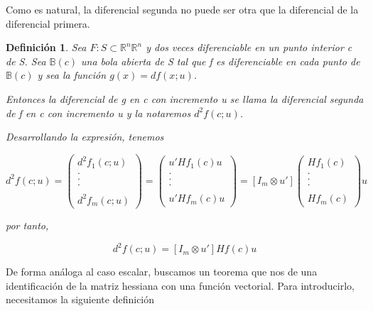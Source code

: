 \documentclass{article}
\theoremstyle{theorem-style}  %
\theoremstyle{definition-style}
\newtheorem{definition}{Definición}[section]
\theoremstyle{example-style}
\theoremstyle{exercise-style}
\begin{document}
	Como es natural, la diferencial segunda no puede ser otra que la diferencial de la diferencial primera. 
	
	\begin{definition}
		Sea $F: S \subset \mathbb{R}^n \mathbb{R}^n$ y dos veces diferenciable en un punto interior c de S. Sea $\mathbb{B}(c)$ una bola abierta de S tal que f es diferenciable en cada punto de  $\mathbb{B}(c)$  y sea la función $g(x) = df(x;u)$. 
		
		Entonces la diferencial de g en c con incremento u se llama la diferencial segunda de f en c con incremento u y la notaremos $d^2 f(c;u)$.
		
		Desarrollando la expresión, tenemos
		
		$$d^2 f(c;u)= \left({\begin{array}{c}
			d^2 f_1(c;u)\\
			.\\
			.\\
			.\\
			\\
			d^2 f_m(c;u)
			\end{array} } \right) = \left({\begin{array}{c}
			u' H f_1(c) u\\
			.\\
			.\\
			.\\
			\\
			u' H f_m(c)u
			\end{array} } \right) = [I_m \otimes u'] \left({\begin{array}{c}
			H f_1(c)\\
			.\\
			.\\
			.\\
			\\
			H f_m(c)
			\end{array} } \right)u$$
		
		por tanto,
		
		$$d^2 f(c;u) = [I_m \otimes u'] H f(c) u$$
	\end{definition}
	
	De forma análoga al caso escalar, buscamos un teorema que nos de una identificación de la matriz hessiana con una función vectorial. Para introducirlo, necesitamos la siguiente definición
	
\end{document}
